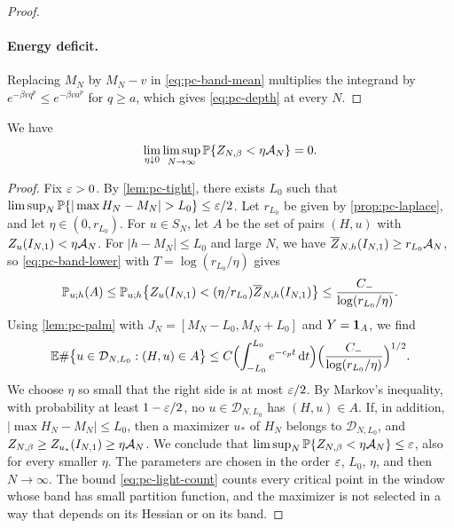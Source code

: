 \begin{proof}
\paragraph{Energy deficit.}
Replacing $M_N$ by $M_N-v$ in \eqref{eq:pc-band-mean} multiplies the integrand by $e^{-\beta vq^p}\le e^{-\beta va^p}$ for $q\ge a$, which gives \eqref{eq:pc-depth} at every $N$.
\end{proof}

\begin{proposition}\label{prop:pc-denominator}
We have
\begin{equation}\label{eq:pc-denominator}
\lim_{\eta\downarrow0}\limsup_{N\to\infty}\mathbb P\{Z_{N,\beta}<\eta\mathcal A_N\}=0.
\end{equation}
\end{proposition}

\begin{proof}
Fix $\varepsilon>0$. By \cref{lem:pc-tight}, there exists $L_0$ such that $\limsup_N\Pp\{|\max H_N-M_N|>L_0\}\le\eps/2$. Let $r_{L_0}$ be given by \cref{prop:pc-laplace}, and let $\eta\in(0,r_{L_0})$. For $u\in S_N$, let $A$ be the set of pairs $(H,u)$ with $Z_u(I_{N,1})<\eta\mathcal A_N$. For $|h-M_N|\le L_0$ and large $N$, we have $\overline Z_{N,h}(I_{N,1})\ge r_{L_0}\mathcal A_N$, so \eqref{eq:pc-band-lower} with $T=\log(r_{L_0}/\eta)$ gives
\[
\mathbb P_{u;h}(A)\le\mathbb P_{u;h}\bigl\{Z_u(I_{N,1})<(\eta/r_{L_0})\overline Z_{N,h}(I_{N,1})\bigr\}\le\frac{C_-}{\log(r_{L_0}/\eta)}.
\]
Using \cref{lem:pc-palm} with $J_N=[M_N-L_0,M_N+L_0]$ and $Y=\mathbf 1_A$, we find
\begin{equation}\label{eq:pc-light-count}
\mathbb E\#\bigl\{u\in\mathcal D_{N,L_0}:(H,u)\in A\bigr\}\le C\Bigl(\int_{-L_0}^{L_0}e^{-c_pt}\,\mathrm d t\Bigr)\Bigl(\frac{C_-}{\log(r_{L_0}/\eta)}\Bigr)^{1/2}.
\end{equation}
We choose $\eta$ so small that the right side is at most $\varepsilon/2$. By Markov's inequality, with probability at least $1-\varepsilon/2$, no $u\in\mathcal D_{N,L_0}$ has $(H,u)\in A$. If, in addition, $|\max H_N-M_N|\le L_0$, then a maximizer $u_*$ of $H_N$ belongs to $\mathcal D_{N,L_0}$, and $Z_{N,\beta}\ge Z_{u_*}(I_{N,1})\ge\eta\mathcal A_N$. We conclude that $\limsup_N\mathbb P\{Z_{N,\beta}<\eta\mathcal A_N\}\le\varepsilon$, also for every smaller $\eta$. The parameters are chosen in the order $\varepsilon$, $L_0$, $\eta$, and then $N\to\infty$. The bound \eqref{eq:pc-light-count} counts every critical point in the window whose band has small partition function, and the maximizer is not selected in a way that depends on its Hessian or on its band.
\end{proof}

